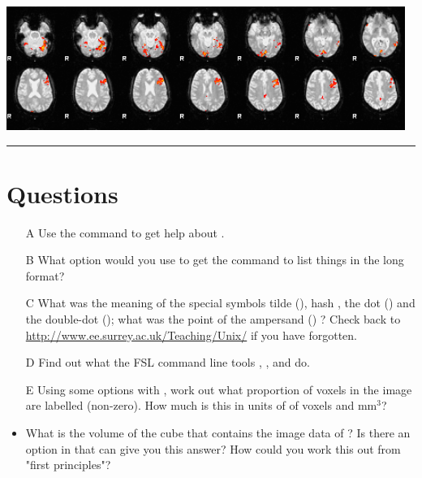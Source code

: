 \begin{enumerate}
	         \begin{center}
    \includegraphics[width=13cm]{rendered_thresh_zfstat1_crop.png}
	\end{center}
	
	
\end{enumerate}

\hrule


\section{Questions}

\begin{itemize}
\item[A]	Use the  command to get help about  . 
\item[B] What option would you use to get the  command to list things in the long format?
\item[C] What was the meaning of the special symbols tilde (\unix{\~}), hash \unix{\#}, the dot () and the double-dot (); what was the point of the ampersand (\unix{\&}) ? Check back to \url{http://www.ee.surrey.ac.uk/Teaching/Unix/} if you have forgotten.

\vspace{.2cm}

\item[D]	Find out what the FSL command line tools ,  , and   do. 

\item[E]  Using some options with , work out what proportion of voxels in the image  are labelled (non-zero). How much is this in units of of voxels and mm$^3$? 

\item What is the volume of the cube that contains the image data of ? Is there an option in  that can give you this answer? How could you work this out from "first principles"?

\end{itemize}

